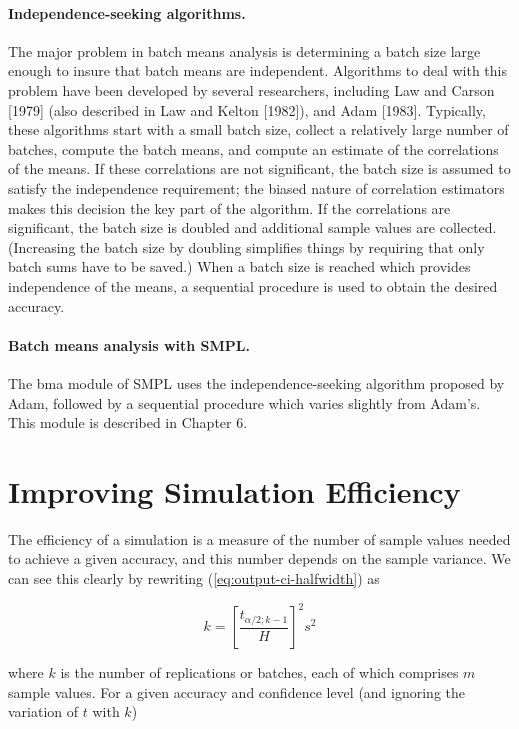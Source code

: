 \paragraph{Independence-seeking algorithms.}
The major problem in batch means analysis is determining a batch size large
enough to insure that batch means are independent. Algorithms to deal with this
problem have been developed by several researchers, including Law and Carson
[1979] (also described in Law and Kelton [1982]), and Adam [1983]. Typically,
these algorithms start with a small batch size, collect a relatively large number
of batches, compute the batch means, and compute an estimate of the correlations
of the means. If these correlations are not significant, the batch size is
assumed to satisfy the independence requirement; the biased nature of correlation
estimators makes this decision the key part of the algorithm. If the
correlations are significant, the batch size is doubled and additional sample
values are collected. (Increasing the batch size by doubling simplifies things
by requiring that only batch sums have to be saved.) When a batch size is reached
which provides independence of the means, a sequential procedure is used to
obtain the desired accuracy.

\paragraph{Batch means analysis with SMPL.}
The bma module of SMPL uses the independence-seeking algorithm proposed by Adam,
followed by a sequential procedure which varies slightly from Adam's. This module
is described in Chapter 6.

\section{Improving Simulation Efficiency}
\label{sec:improving-efficiency}

The efficiency of a simulation is a measure of the number of sample values
needed to achieve a given accuracy, and this number depends on the sample
variance. We can see this clearly by rewriting (\ref{eq:output-ci-halfwidth})
as

\begin{equation}
k = \left[\frac{t_{\alpha/2;k-1}}{H}\right]^2 s^2
\label{eq:output-k-variance}
\end{equation}

where $k$ is the number of replications or batches, each of which comprises $m$
sample values. For a given accuracy and confidence level (and ignoring the
variation of $t$ with $k$)

